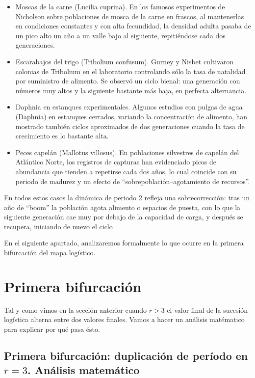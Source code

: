 \documentclass[
  11pt,
  a4paper,
  DIV=11,
  numbers=noendperiod]{scrreprt}
\begin{document}
\begin{itemize}
\item
  Moscas de la carne (Lucilia cuprina). En los famosos experimentos de
  Nicholson sobre poblaciones de mosca de la carne en frascos, al
  mantenerlas en condiciones constantes y con alta fecundidad, la
  densidad adulta pasaba de un pico alto un año a un valle bajo al
  siguiente, repitiéndose cada dos generaciones.
\item
  Escarabajos del trigo (Tribolium confusum). Gurney y Nisbet cultivaron
  colonias de Tribolium en el laboratorio controlando sólo la tasa de
  natalidad por suministro de alimento. Se observó un ciclo bienal: una
  generación con números muy altos y la siguiente bastante más baja, en
  perfecta alternancia.
\item
  Daphnia en estanques experimentales. Algunos estudios con pulgas de
  agua (Daphnia) en estanques cerrados, variando la concentración de
  alimento, han mostrado también ciclos aproximados de dos generaciones
  cuando la tasa de crecimiento es lo bastante alta.
\item
  Peces capelán (Mallotus villosus). En poblaciones silvestres de
  capelán del Atlántico Norte, los registros de capturas han evidenciado
  picos de abundancia que tienden a repetirse cada dos años, lo cual
  coincide con su periodo de madurez y un efecto de
  ``sobrepoblación--agotamiento de recursos''.
\end{itemize}

En todos estos casos la dinámica de periodo 2 refleja una
sobrecorrección: tras un año de ``boom'' la población agota alimento o
espacios de puesta, con lo que la siguiente generación cae muy por
debajo de la capacidad de carga, y después se recupera, iniciando de
nuevo el ciclo

En el siguiente apartado, analizaremos formalmente lo que ocurre en la
primera bifurcación del mapa logístico.

\chapter{Primera bifurcación}\label{primera-bifurcaciuxf3n}

Tal y como vimos en la sección anterior cuando \(r > 3\) el valor final
de la sucesión logística alterna entre dos valores finales. Vamos a
hacer un análisis matématico para explicar por qué pasa ésto.

\section{\texorpdfstring{Primera bifurcación: duplicación de período en
\(r = 3\). Análisis
matemático}{Primera bifurcación: duplicación de período en r = 3. Análisis matemático}}\label{primera-bifurcaciuxf3n-duplicaciuxf3n-de-peruxedodo-en-r-3.-anuxe1lisis-matemuxe1tico}
\end{document}
